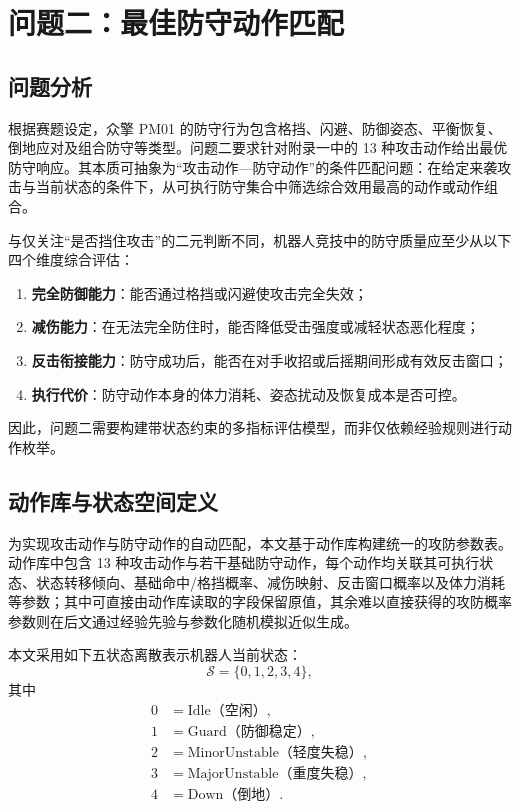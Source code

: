 \section{问题二：最佳防守动作匹配}

\subsection{问题分析}

根据赛题设定，众擎 PM01 的防守行为包含格挡、闪避、防御姿态、平衡恢复、倒地应对及组合防守等类型。问题二要求针对附录一中的 13 种攻击动作给出最优防守响应。其本质可抽象为“攻击动作—防守动作”的条件匹配问题：在给定来袭攻击与当前状态的条件下，从可执行防守集合中筛选综合效用最高的动作或动作组合。

与仅关注“是否挡住攻击”的二元判断不同，机器人竞技中的防守质量应至少从以下四个维度综合评估：
\begin{enumerate}
    \item \textbf{完全防御能力}：能否通过格挡或闪避使攻击完全失效；
    \item \textbf{减伤能力}：在无法完全防住时，能否降低受击强度或减轻状态恶化程度；
    \item \textbf{反击衔接能力}：防守成功后，能否在对手收招或后摇期间形成有效反击窗口；
    \item \textbf{执行代价}：防守动作本身的体力消耗、姿态扰动及恢复成本是否可控。
\end{enumerate}

因此，问题二需要构建带状态约束的多指标评估模型，而非仅依赖经验规则进行动作枚举。

\subsection{动作库与状态空间定义}

为实现攻击动作与防守动作的自动匹配，本文基于动作库构建统一的攻防参数表。动作库中包含 13 种攻击动作与若干基础防守动作，每个动作均关联其可执行状态、状态转移倾向、基础命中/格挡概率、减伤映射、反击窗口概率以及体力消耗等参数；其中可直接由动作库读取的字段保留原值，其余难以直接获得的攻防概率参数则在后文通过经验先验与参数化随机模拟近似生成。

本文采用如下五状态离散表示机器人当前状态：
\[
\mathcal{S}=\{0,1,2,3,4\},
\]
其中
\[
\begin{aligned}
0 &= \text{Idle（空闲）},\\
1 &= \text{Guard（防御稳定）},\\
2 &= \text{MinorUnstable（轻度失稳）},\\
3 &= \text{MajorUnstable（重度失稳）},\\
4 &= \text{Down（倒地）}.
\end{aligned}
\]


